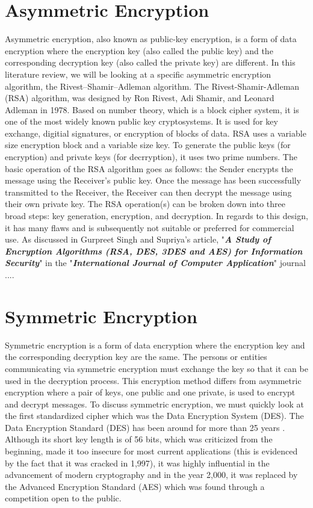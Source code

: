 \documentclass[journal]{IEEEtran}
\begin{document}
\section{\textbf{Asymmetric Encryption}}
Asymmetric encryption, also known as public-key encryption, is a form of data encryption where the encryption key (also called the public key) and the corresponding decryption key (also called the private key) are different. In this literature review, we will be looking at a specific asymmetric encryption algorithm, the Rivest–Shamir–Adleman algorithm. The Rivest-Shamir-Adleman (RSA) algorithm, was designed by Ron Rivest, Adi Shamir, and Leonard Adleman in 1978. Based on number theory, which is a block cipher system, it is one of the most widely known public key cryptosystems. It is used for key exchange, digitial signatures, or encryption of blocks of data. RSA uses a variable size encryption block and a variable size key. To generate the public keys (for encryption) and private keys (for decrryption), it uses two prime numbers. The basic operation of the RSA algorithm goes as follows: the Sender encrypts the message using the Receiver's public key. Once the message has been successfully transmitted to the Receiver, the Receiver can then decrypt the message using their own private key. The RSA operation(s) can be broken down into three broad steps: key generation, encryption, and decryption. In regards to this design, it has many flaws and is subsequently not suitable or preferred for commercial use. As discussed in Gurpreet Singh and Supriya's article, "\textbf{\textit{A Study of Encryption Algorithms (RSA, DES, 3DES and AES) for Information Security}}" in the "\textbf{\textit{International Journal of Computer Application}}" journal \cite{Encryption_Study}....

\section{\textbf{Symmetric Encryption}}
Symmetric encryption is a form of data encryption where the encryption key and the corresponding decryption key are the same. The persons or entities communicating via symmetric encryption must exchange the key so that it can be used in the decryption process. This encryption method differs from asymmetric encryption where a pair of keys, one public and one private, is used to encrypt and decrypt messages. To discuss symmetric encryption, we must quickly look at the first standardized cipher which was
the Data Encryption System (DES). 
\newline \newline
The Data Encryption Standard (DES) has been around for more than 25 years \cite{DES}. Although its short key length is of 56 bits, which was criticized from the beginning, made it too insecure for most current applications (this is evidenced by the fact that it was cracked in 1,997), it was highly influential in the advancement of modern cryptography and in the year 2,000, it was replaced by the Advanced Encryption Standard (AES) which was found through a competition open to the public.
\end{document}
